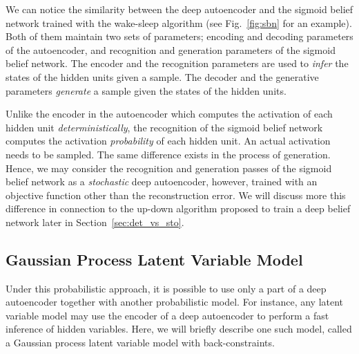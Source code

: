 \documentclass{now}
\begin{document}
We can notice the similarity between the deep
autoencoder and the sigmoid belief network trained with the
wake-sleep algorithm (see Fig.~\ref{fig:sbn} for an
example). Both of them maintain two sets of parameters;
encoding and decoding parameters of the autoencoder, and
recognition and generation parameters of the sigmoid belief
network. The encoder and the recognition parameters are
used to \textit{infer} the states of the hidden units given
a sample. The decoder and the generative parameters
\textit{generate} a sample given the states of the hidden
units.

Unlike the encoder in the autoencoder which
computes the activation of each hidden unit
\textit{deterministically}, the recognition of the sigmoid
belief network computes the activation \textit{probability}
of each hidden unit. An actual activation needs to be
sampled. The same difference exists in the process of
generation. Hence, we may consider the recognition and
generation passes of the sigmoid belief network as a
\textit{stochastic} deep autoencoder, however, trained with an
objective function other than the reconstruction error.
We will discuss more this difference in connection to
the up-down algorithm proposed to train a deep belief
network \citep{Hinton2006nc} later in
Section~\ref{sec:det_vs_sto}.

%

\subsection{Gaussian Process Latent Variable Model}

Under this probabilistic approach, it is possible to use
only a
part of a deep autoencoder together with another
probabilistic model. For instance, any latent variable model
may use the encoder of a deep autoencoder to perform a fast
inference of hidden variables. Here, we will briefly
describe one such model, called a Gaussian process latent
variable model with back-constraints.
\end{document}
